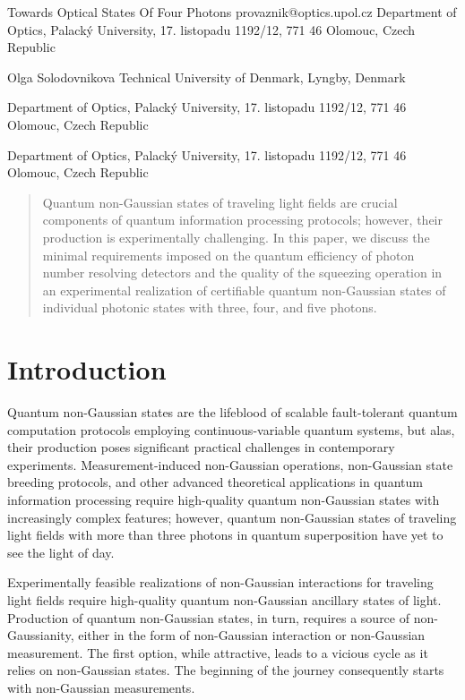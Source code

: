 \documentclass{article}
\begin{document}
\ArticleTitle
  {Towards Optical States Of Four Photons}
  {provaznik@optics.upol.cz}
\ArticleAuthorAddress
  {Department of Optics, Palack\'{y} University, 17. listopadu 1192/12, 771 46 Olomouc, Czech Republic}

\ArticleAuthor
  {Olga Solodovnikova}
\ArticleAuthorAddress
  {Technical University of Denmark, Lyngby, Denmark}

\ArticleAuthorAddress
  {Department of Optics, Palack\'{y} University, 17. listopadu 1192/12, 771 46 Olomouc, Czech Republic}

\ArticleAuthorAddress
  {Department of Optics, Palack\'{y} University, 17. listopadu 1192/12, 771 46 Olomouc, Czech Republic}

\ArticleTitlePrint

\begin{abstract}\noindent
  Quantum non-Gaussian states of traveling light fields are crucial components of quantum information processing protocols; however, their production is experimentally challenging. In this paper, we discuss the minimal requirements imposed on the quantum efficiency of photon number resolving detectors and the quality of the squeezing operation in an experimental realization of certifiable quantum non-Gaussian states of individual photonic states with three, four, and five photons.
\end{abstract}

%

\section{Introduction}

Quantum non-Gaussian states are the lifeblood of scalable fault-tolerant quantum computation protocols employing continuous-variable quantum systems, but alas, their production poses significant practical challenges in contemporary experiments. Measurement-induced non-Gaussian operations, non-Gaussian state breeding protocols, and other advanced theoretical applications in quantum information processing require high-quality quantum non-Gaussian states with increasingly complex features; however, quantum non-Gaussian states of traveling light fields with more than three photons in quantum superposition have yet to see the light of day.

Experimentally feasible realizations of non-Gaussian interactions for traveling light fields require high-quality quantum non-Gaussian ancillary states of light. Production of quantum non-Gaussian states, in turn, requires a source of non-Gaussianity, either in the form of non-Gaussian interaction or non-Gaussian measurement. The first option, while attractive, leads to a vicious cycle as it relies on non-Gaussian states. The beginning of the journey consequently starts with non-Gaussian measurements.
\end{document}
